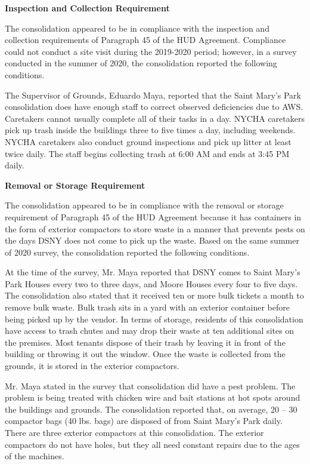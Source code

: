  

\textbf{Inspection and Collection Requirement} 

 

The consolidation appeared to be in compliance with the inspection and collection requirements of Paragraph 45 of the HUD Agreement. Compliance could not conduct a site visit during the 2019-2020 period; however, in a survey conducted in the summer of 2020, the consolidation reported the following conditions.

The Supervisor of Grounds, Eduardo Maya, reported that the Saint Mary's Park consolidation does have enough staff to correct observed deficiencies due to AWS. Caretakers cannot usually complete all of their tasks in a day. NYCHA caretakers pick up trash inside the buildings three to five times a day, including weekends. NYCHA caretakers also conduct ground inspections and pick up litter at least twice daily. The staff begins collecting trash at 6:00 AM and ends at 3:45 PM daily.

\textbf{Removal or Storage Requirement} 

The consolidation appeared to be in compliance with the removal or storage requirement of Paragraph  45 of the HUD Agreement because it has containers in the form of exterior compactors to store waste in a manner that prevents pests on the days DSNY does not come to pick up the waste. Based on the same summer of  2020  survey, the consolidation reported the following conditions.

 

At the time of the survey, Mr. Maya reported that DSNY comes to Saint Mary's Park Houses every two to three days, and Moore Houses every four to five days. The consolidation also stated that it received ten or more bulk tickets a month to remove bulk waste. Bulk trash sits in a yard with an exterior container before being picked up by the vendor. In terms of storage, residents of this consolidation have access to trash chutes and may drop their waste at ten additional sites on the premises. Most tenants dispose of their trash by leaving it in front of the building or throwing it out the window. Once the waste is collected from the grounds, it is stored in the exterior compactors.  

 

Mr. Maya stated in the survey that consolidation did have a pest problem. The problem is being treated with chicken wire and bait stations at hot spots around the buildings and grounds. The consolidation reported that, on average, 20 -- 30 compactor bags (40 lbs. bags)  are disposed of from Saint Mary's Park daily. There are three exterior compactors at this consolidation. The exterior compactors do not have holes, but they all need constant repairs due to the ages of the machines. 

